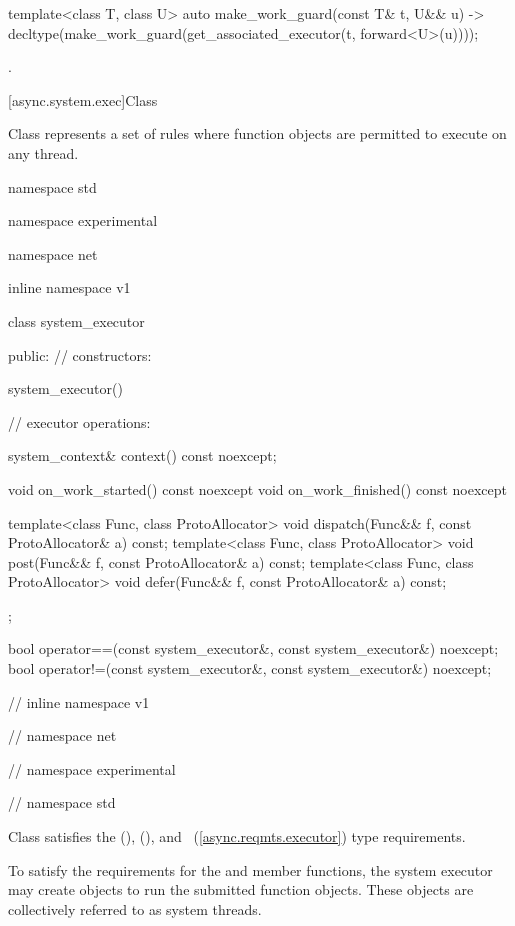 \begin{itemdecl}
template<class T, class U>
  auto make_work_guard(const T& t, U&& u)
    -> decltype(make_work_guard(get_associated_executor(t, forward<U>(u))));
\end{itemdecl}

\begin{itemdescr}
\pnum
\returns {}.
\end{itemdescr}



[async.system.exec]{Class }

\pnum
Class  represents a set of rules where function objects are permitted to execute on any thread.

\begin{codeblock}
namespace std {
namespace experimental {
namespace net {
inline namespace v1 {

  class system_executor
  {
  public:
    // constructors:

    system_executor() {}

    // executor operations:

    system_context& context() const noexcept;

    void on_work_started() const noexcept {}
    void on_work_finished() const noexcept {}

    template<class Func, class ProtoAllocator>
      void dispatch(Func&& f, const ProtoAllocator& a) const;
    template<class Func, class ProtoAllocator>
      void post(Func&& f, const ProtoAllocator& a) const;
    template<class Func, class ProtoAllocator>
      void defer(Func&& f, const ProtoAllocator& a) const;
  };

  bool operator==(const system_executor&, const system_executor&) noexcept;
  bool operator!=(const system_executor&, const system_executor&) noexcept;

} // inline namespace v1
} // namespace net
} // namespace experimental
} // namespace std
\end{codeblock}

\pnum
Class  satisfies the  (),  (), and ~(\ref{async.reqmts.executor}) type requirements.

\pnum
To satisfy the  requirements for the  and  member functions, the system executor may create  objects to run the submitted function objects. These  objects are collectively referred to as system threads.


